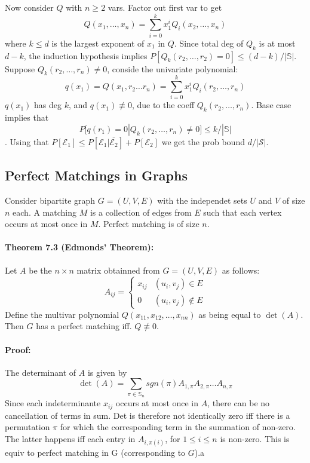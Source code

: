 \documentclass[a4paper]{article}
\begin{document}
Now consider $Q$ with $n\geq 2$ vars. Factor out first var to get
$$
Q(x_1,\ldots,x_n)=\sum^{k}_{i=0} x_1^iQ_i(x_2,\ldots,x_n)
$$
where $k\leq d$ is the largest exponent of $x_1$ in $Q$. Since total deg of $Q_k$ is at most $d-k$, the induction hypothesis implies $P[Q_k(r_2,\ldots,r_2)=0]\leq (d-k)/|\mathbb{S}|$. Suppose $Q_k(r_2,\ldots,r_n)\not = 0$, conside the univariate polynomial:
$$
  q(x_1)=Q(x_1,r_2\ldots r_n)= \sum^{k}_{i=0} x^i_1Q_i(r_2,\ldots,r_n)
$$
$q(x_1)$ has deg $k$, and $q(x_1)\not\equiv 0$, due to the coeff $Q_k(r_2,\ldots,r_n)$. Base case implies that
$$P[q(r_1)=0|Q_k(r_2,\ldots,r_n)\not=0]\leq k/|\mathbb{S}|$$.
Using that $P[\mathcal{E}_1]\leq P[\mathcal{E}_1|\overline{\mathcal{E}_2}]+P[\mathcal{E}_2]$ we get the prob bound $d/|\mathcal{S}|$.

\subsection{Perfect Matchings in Graphs}
\label{sub:Perfect Matchings in Graphs}
Consider bipartite graph $G=(U,V,E)$ with the independet sets $U$ and $V$ of size $n$ each. A matching $M$ is a collection of edges from $E$ such that each vertex occurs at most once in $M$. Perfect matching is of size $n$.

\paragraph{Theorem 7.3 (Edmonds' Theorem):} Let $A$ be the $n\times n$ matrix obtainned from $G=(U,V,E)$ as follows:
$$
  A_{ij}=\begin{cases}
    x_{ij} & (u_i,v_j)\in E\\
    0      & (u_i,v_j)\not \in E
  \end{cases}
$$
Define the multivar polynomial $Q(x_{11},x_{12},\ldots,x_{nn})$ as being equal to $\det(A)$. Then $G$ has a perfect matching iff. $Q\not\equiv 0$.
\paragraph{Proof:} The determinant of $A$ is given by
$$
\det(A) = \sum_{\pi\in\mathbb{S}_n} sgn(\pi)A_{1,\pi}A_{2,\pi}\ldots A_{n,\pi}
$$
Since each indeterminante $x_{ij}$ occurs at most once in $A$, there can be no cancellation of terms in sum. Det is therefore not identically zero iff there is a permutation $\pi$ for which the corresponding term in the summation of non-zero. The latter happens iff each entry in $A_{i,\pi(i)}$, for $1\leq i\leq n$ is non-zero. This is equiv to perfect matching in G (corresponding to $G$).a
\end{document}
